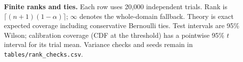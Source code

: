 \textbf{Finite ranks and ties.} Each row uses 20,000 independent trials. Rank is $\lceil(n+1)(1-\alpha)\rceil$; $\infty$ denotes the whole-domain fallback. Theory is exact expected coverage including conservative Bernoulli ties. Test intervals are 95\% Wilson; calibration coverage (CDF at the threshold) has a pointwise 95\% $t$ interval for its trial mean. Variance checks and seeds remain in \texttt{tables/rank\_checks.csv}.
